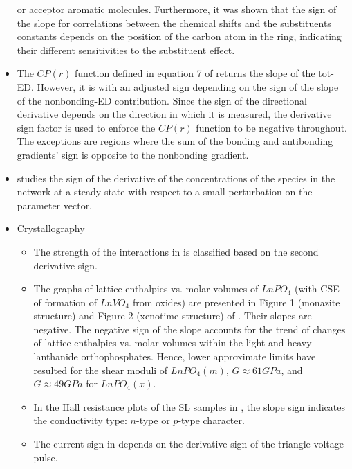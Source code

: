 \documentclass[11pt]{book}
\begin{document}
\begin{itemize}
or acceptor aromatic molecules. Furthermore, it was shown that the
sign of the slope for correlations between the chemical shifts and
the substituents constants depends on the position of the carbon atom
in the ring, indicating their different sensitivities to the substituent
effect.
\item The $CP\left(r\right)$ function defined in equation 7 of \cite{de2018faldi}
returns the slope of the tot-ED. However, it is with an adjusted sign
depending on the sign of the slope of the nonbonding-ED contribution.
Since the sign of the directional derivative depends on the direction
in which it is measured, the derivative sign factor is used to enforce
the $CP\left(r\right)$ function to be negative throughout. The exceptions
are regions where the sum of the bonding and antibonding gradients'
sign is opposite to the nonbonding gradient.
\item \cite{feliu2019sign}
studies the sign of the derivative of the concentrations of the species
in the network at a steady state with respect to a small perturbation
on the parameter vector.
\item Crystallography
\begin{itemize}
\item The strength of the interactions in \cite{ruiz2014unusual}
is classified based on the second derivative sign.
\item The graphs of lattice enthalpies vs. molar volumes of $LnPO_{4}$
(with CSE of formation of $LnVO_{4}$ from oxides) are presented in
Figure 1 (monazite structure) and Figure 2 (xenotime structure) of
\cite{petrov2014lattice}.
Their slopes are negative. The negative sign of the slope accounts
for the trend of changes of lattice enthalpies vs. molar volumes within
the light and heavy lanthanide orthophosphates. Hence, lower approximate
limits have resulted for the shear moduli of $LnPO_{4}\left(m\right)$,
$G\approx61GPa$, and $G\approx49GPa$ for $LnPO_{4}\left(x\right)$.
\item In the Hall resistance plots of the SL samples in \cite{levy2020designer},
the slope sign indicates the conductivity type: $n$-type or $p$-type
character.
\item The current sign in \cite{prywer2020first}
depends on the derivative sign of the triangle voltage pulse.
\end{itemize}
\end{itemize}
\end{document}
